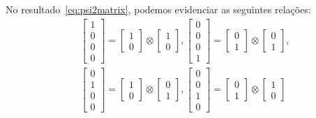 No resultado~\eqref{eq:psi2matrix}, podemos evidenciar as seguintes relações:
\begin{equation}\label{eq:prodtens1}
	\begin{split}
&\begin{bmatrix}
1 \\
0 \\
0 \\
0
\end{bmatrix} = \begin{bmatrix}
1 \\
0
\end{bmatrix} \otimes \begin{bmatrix}
1 \\
0
\end{bmatrix},
\begin{bmatrix}
0 \\
0 \\
0 \\
1
\end{bmatrix} = \begin{bmatrix}
0 \\
1
\end{bmatrix} \otimes \begin{bmatrix}
0 \\
1
\end{bmatrix}, \\
&\begin{bmatrix}
0 \\
1 \\
0 \\
0
\end{bmatrix} = \begin{bmatrix}
1 \\
0
\end{bmatrix} \otimes \begin{bmatrix}
0 \\
1
\end{bmatrix},
\begin{bmatrix}
0 \\
0 \\
1 \\
0
\end{bmatrix} = \begin{bmatrix}
0 \\
1
\end{bmatrix} \otimes \begin{bmatrix}
1 \\
0
\end{bmatrix}
	\end{split}
\end{equation}

